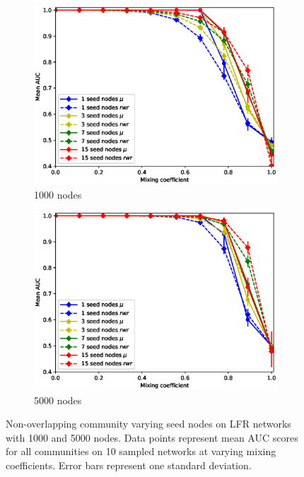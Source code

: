 \documentclass[sigconf]{acmart}
\begin{document}
\begin{figure}[t]
    \centering
    \begin{subfigure}[b]{0.45\textwidth}
        \centering
        \includegraphics[width=\textwidth]{images/lfr_binary_mo_overlap_auc_1000.eps}
        \caption{1000 nodes}
    \end{subfigure}
    \begin{subfigure}[b]{0.45\textwidth}
        \centering
        \includegraphics[width=\textwidth]{images/lfr_binary_mo_overlap_auc_5000.eps}
        \caption{5000 nodes}
    \end{subfigure}
    \caption{Non-overlapping community varying seed nodes on LFR networks with 1000 and 5000 nodes.
     Data points represent mean AUC scores for all communities on 10 sampled networks at varying mixing coefficients.
     Error bars represent one standard deviation.}
     \label{fig:auc_no_overlap}
\end{figure}
\end{document}
